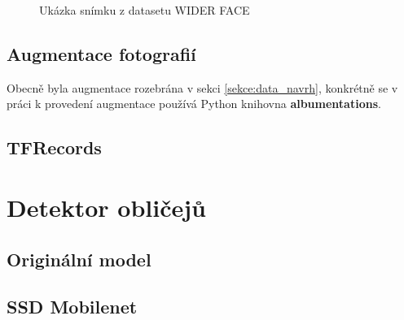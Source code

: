 \begin{figure}[H]
  \begin{center}
  \label{obrazek:widerfaceexample}
  \caption{Ukázka snímku z datasetu WIDER FACE}
  \end{center}
\end{figure}

\subsection*{Augmentace fotografií}
Obecně byla augmentace rozebrána v sekci \ref{sekce:data_navrh}, konkrétně se v práci k provedení augmentace používá Python knihovna \textbf{albumentations}. 

\subsection*{TFRecords}


\section{Detektor obličejů}
\label{sekce:detektor_obliceju_implementace}

\subsection*{Originální model}

\subsection*{SSD Mobilenet}

